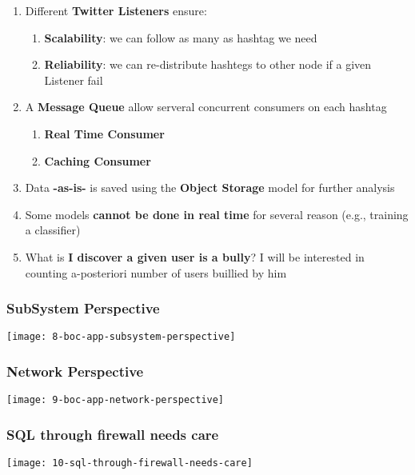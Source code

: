 \begin{enumerate}
	\item Different \textbf{Twitter Listeners} ensure:
	\begin{enumerate}
		\item \textbf{Scalability}: we can follow as many as hashtag we need
		\item \textbf{Reliability}: we can re-distribute hashtegs to other node if a given Listener fail
	\end{enumerate}
	\item A \textbf{Message Queue} allow serveral concurrent consumers on each hashtag
	\begin{enumerate}
		\item \textbf{Real Time Consumer}
		\item \textbf{Caching Consumer}
	\end{enumerate}
	\item Data \textbf{-as-is-} is saved using the \textbf{Object Storage} model for further analysis
	\item Some models \textbf{cannot be done in real time} for several reason (e.g., training a classifier)
	\item What is \textbf{I discover a given user is a bully}? I will be interested in counting a-posteriori number of users buillied by him
\end{enumerate}

\subsubsection{SubSystem Perspective}
\begin{center}
\texttt{[image: 8-boc-app-subsystem-perspective]}
\end{center}

\subsubsection{Network Perspective}
\begin{center}
\texttt{[image: 9-boc-app-network-perspective]}
\end{center}

\subsubsection{SQL through firewall needs care}
\begin{center}
\texttt{[image: 10-sql-through-firewall-needs-care]}
\end{center}

